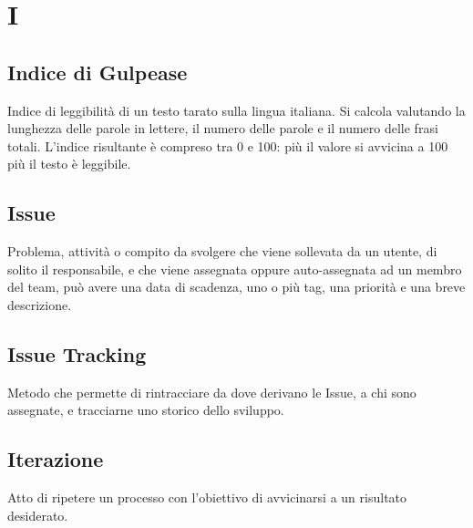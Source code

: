 \section*{I}

\subsection{Indice di Gulpease}
Indice di leggibilità di un testo tarato sulla lingua italiana. Si calcola valutando la lunghezza delle parole in lettere, il numero delle parole e il numero delle frasi totali. L'indice risultante è compreso tra 0 e 100: più il valore si avvicina a 100 più il testo è leggibile.

\subsection{Issue}
Problema, attività o compito da svolgere che viene sollevata da un utente, di solito il responsabile, e che viene assegnata oppure auto-assegnata ad un membro del team, può avere una data di scadenza, uno o più tag, una priorità e una breve descrizione.

\subsection{Issue Tracking}
Metodo che permette di rintracciare da dove derivano le Issue, a chi sono assegnate, e tracciarne uno storico dello sviluppo.

\subsection{Iterazione}
Atto di ripetere un processo con l'obiettivo di avvicinarsi a un risultato desiderato.